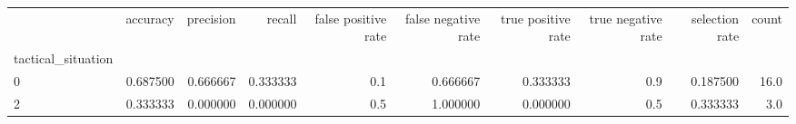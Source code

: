 \begin{tabular}{lrrrrrrrrr}
\toprule
{} &  accuracy &  precision &    recall &  false positive rate &  false negative rate &  true positive rate &  true negative rate &  selection rate &  count \\
tactical\_situation &           &            &           &                      &                      &                     &                     &                 &        \\
\midrule
0                  &  0.687500 &   0.666667 &  0.333333 &                  0.1 &             0.666667 &            0.333333 &                 0.9 &        0.187500 &   16.0 \\
2                  &  0.333333 &   0.000000 &  0.000000 &                  0.5 &             1.000000 &            0.000000 &                 0.5 &        0.333333 &    3.0 \\
\bottomrule
\end{tabular}
